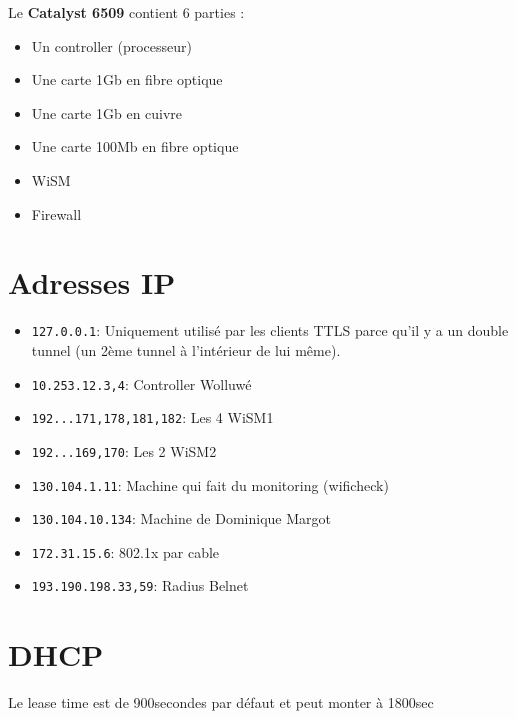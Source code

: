 \documentclass[10pt,a4paper]{article}
\begin{document}
Le \textbf{Catalyst 6509} contient 6 parties :
\begin{itemize}
\item Un controller (processeur)
\item Une carte 1Gb en fibre optique
\item Une carte 1Gb en cuivre
\item Une carte 100Mb en fibre optique
\item WiSM
\item Firewall
\end{itemize}

\section{Adresses IP}
\begin{itemize}
\item \texttt{127.0.0.1}: Uniquement utilisé par les clients TTLS parce qu'il y a un double tunnel (un 2ème tunnel à l'intérieur de lui même).
\item \texttt{10.253.12.3,4}: Controller Wolluwé
\item \texttt{192...171,178,181,182}: Les 4 WiSM1
\item \texttt{192...169,170}: Les 2 WiSM2
\item \texttt{130.104.1.11}: Machine qui fait du monitoring (wificheck)
\item \texttt{130.104.10.134}: Machine de Dominique Margot
\item \texttt{172.31.15.6}: 802.1x par cable
\item \texttt{193.190.198.33,59}: Radius Belnet
\end{itemize}

\section{DHCP}
Le lease time est de 900secondes par défaut et peut monter à 1800sec
\end{document}
